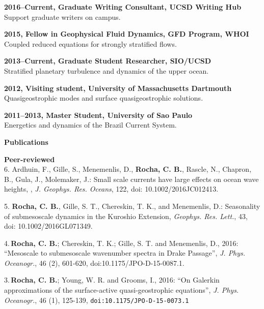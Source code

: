 \documentclass[a4paper,11pt,final]{memoir}
\newcommand{\Sep}{\vspace{1.25em}}
\newcommand{\SmallSep}{\vspace{0.5em}}
\newcommand{\CVSection}[1]
    {\Large\textbf{#1}\par
    \SmallSep\normalsize\normalfont}
\newcommand{\CVItem}[1]
    {\textbf{\color{NavyBlue} #1}}
\begin{document}
\CVItem{2016--Current, Graduate Writing Consultant, UCSD Writing Hub}\\
Support graduate writers on campus.

\SmallSep
\CVItem{2015, Fellow in Geophysical Fluid Dynamics, GFD Program, WHOI}\\
Coupled reduced equations for strongly stratified flows.
\SmallSep

\CVItem{2013--Current, Graduate Student Researcher, SIO/UCSD}\\
Stratified planetary turbulence and dynamics of the upper ocean.
\SmallSep

\CVItem{2012, Visiting student, University of Massachusetts Dartmouth}\\
Quasigeostrophic modes and surface quasigeostrophic solutions.
\SmallSep

\CVItem{2011--2013, Master Student, University of Sao Paulo}\\
Energetics and dynamics of the Brazil Current System.


\Sep

\CVSection{Publications}


\CVItem{Peer-reviewed}\\

6. Ardhuin, F., Gille, S., Menemenlis, D., \textbf{Rocha, C. B.}, Rascle, N., Chapron, B., Gula, J., Molemaker, J.: Small scale currents have large effects on ocean wave heights,
, \textit{J. Geophys. Res. Oceans}, 122, doi: 10.1002/2016JC012413.

\SmallSep

5.  \textbf{Rocha, C. B.},  Gille, S. T., Chereskin, T. K., and Menemenlis, D.: Seasonality of submesoscale dynamics in the Kuroshio Extension, \textit{Geophys. Res. Lett.}, 43,
doi: 10.1002/2016GL071349.

\SmallSep

4.\,\textbf{Rocha, C. B.};  Chereskin, T. K.; Gille, S. T. and Menemenlis, D., 2016: ``Mesoscale to submesoscale wavenumber spectra in Drake Passage'', \textit{J. Phys. Oceanogr.}, 46 (2), 601-620, doi:10.1175/JPO-D-15-0087.1.

\SmallSep

3.\,\textbf{Rocha, C. B.};  Young, W. R. and Grooms, I., 2016: ``On Galerkin approximations of the surface-active quasi-geostrophic equations'', \textit{J. Phys. Oceanogr.}, 46 (1), 125-139, \texttt{doi:10.1175/JPO-D-15-0073.1}
\end{document}

